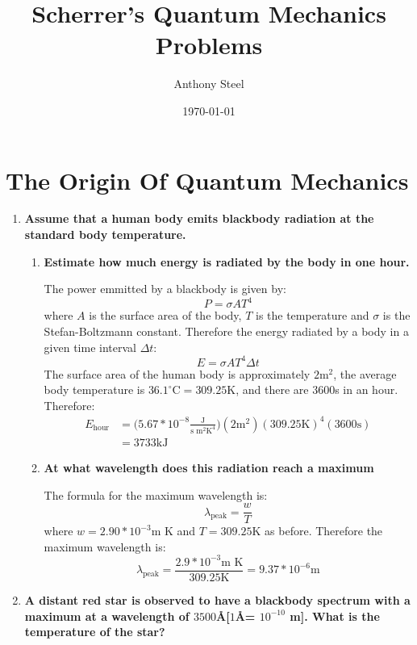 \documentclass[9pt]{report}
\begin{document}
\title{Scherrer's Quantum Mechanics\protect\\ Problems}
\author{Anthony Steel}
\date{\today}
\maketitle
\chapter{The Origin Of Quantum Mechanics}
  \begin{enumerate}
    \item \textbf{Assume that a human body emits blackbody radiation at the
      standard body temperature.}
      \begin{enumerate}
        \item \textbf{Estimate how much energy is radiated by the body in one hour.}

          The power emmitted by a blackbody is given by:
          \[
            P = \sigma A T^4
          \]
          where $A$ is the surface area of the body, $T$ is the temperature
          and $\sigma$ is the Stefan-Boltzmann constant. Therefore
        the energy radiated by a body in a given time interval $\Delta t$:
          \[
            E = \sigma A T^4 \Delta t
          \]
          The surface area of the human body is approximately $2\text{m}^2$,
          the average body temperature is $36.1^{\circ}\text{C} = 309.25 \text{K}$,
          and there are $3600$s in an hour. Therefore:
          \[
            \begin{align}
            E_\text{hour}
            &= \Big(5.67 * 10^{-8} \frac{\text{J}}{\text{s m}^2\text{K}^4}\Big)( 2\text{m}^2 )(309.25\text{K})^4(3600\text{s})\\
            &= 3733 \text{kJ}
            \end{align}
          \]

        \item \textbf{At what wavelength does this radiation reach a maximum}

          The formula for the maximum wavelength is:
          \[
            \lambda_\text{peak} = \frac{w}{T}
          \]
          where $w = 2.90 * 10^{-3} \text{m K}$ and $T = 309.25\text{K}$ as
          before. Therefore the maximum wavelength is:
          \[
            \lambda_\text{peak} = \frac{2.9 * 10^{-3} \text{m K}}{309.25\text{K}} = 9.37 * 10^{-6} \text{m}
          \]
      \end{enumerate}
        \item \textbf{A distant red star is observed to have a blackbody spectrum with a
          maximum at a wavelength of $3500$\AA [$1$\AA = $10^{-10}$ m]. What is the
          temperature of the star?}


\end{enumerate}
\end{document}
